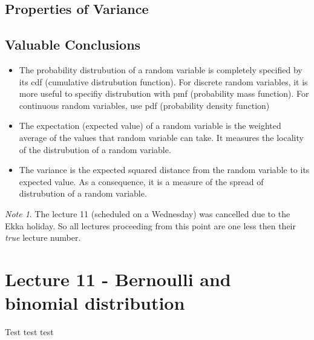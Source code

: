 \documentclass{article}
\theoremstyle{definition}
\theoremstyle{plain}
\newtheorem{theorem}{Theorem}
\theoremstyle{remark}
\newtheorem*{note}{Note}
\begin{document}
  \subsection{Properties of Variance}
  \begin{center}
  \end{center}

  \subsection{Valuable Conclusions}
  \begin{itemize}
    \item The probability distrubution of a random variable is completely
      specified by its cdf (cumulative distrubution function). For discrete
      random variables, it is more useful to specifiy distrubution with pmf
      (probability mass function). For continuous random variables, use pdf
      (probability density function)
    \item The expectation (expected value) of a random variable is the weighted
      average of the values that random variable can take. It measures the
      locality of the distrubution of a random variable.
    \item The variance is the expected squared distance from the random
      variable to its expected value. As a consequence, it is a measure of the
      spread of distrubution of a random variable.
  \end{itemize}
  \begin{note}
    The lecture 11 (scheduled on a Wednesday) was cancelled due to the Ekka
    holiday. So all lectures proceeding from this point are one less then their
    \textit{true} lecture number.
  \end{note}
  \section{Lecture 11 - Bernoulli and binomial distribution}
  Test test test
 
\end{document}
